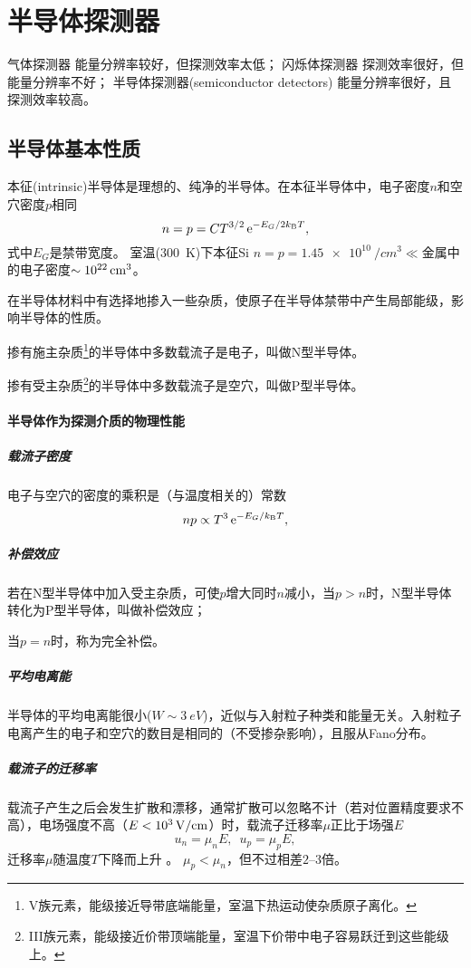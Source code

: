 \clearpage
\section{半导体探测器}
气体探测器
能量分辨率较好，但探测效率太低；
闪烁体探测器
探测效率很好，但能量分辨率不好；%
半导体探测器(semiconductor detectors)
能量分辨率很好，且探测效率较高。
\subsection{半导体基本性质}
本征(intrinsic)半导体是理想的、纯净的半导体。在本征半导体中，电子密度$n$和空穴密度$p$相同
\[
	n=p=CT^{3/2}\mathop{}\!\mathrm{e}^{-E_G/2k_{\mathrm B} T},
\]
式中$E_G$是禁带宽度。
室温(\SI{300}{K})下本征Si $n=p=\SI{1.45e10}{/cm^3}\ll$金属中的电子密度$\sim\SI{E22}{/cm^3}$。

在半导体材料中有选择地掺入一些杂质，使原子在半导体禁带中产生局部能级，影响半导体的性质。
\begin{compactitem}
	\item 掺有施主杂质\footnote{V族元素，能级接近导带底端能量，室温下热运动使杂质原子离化。}的半导体中多数载流子是电子，叫做N型半导体。
	\item 掺有受主杂质\footnote{III族元素，能级接近价带顶端能量，室温下价带中电子容易跃迁到这些能级上。}的半导体中多数载流子是空穴，叫做P型半导体。
\end{compactitem}
\paragraph{半导体作为探测介质的物理性能}
\subparagraph{载流子密度}
电子与空穴的密度的乘积是（与温度相关的）常数
\[
	np\propto T^3\mathop{}\!\mathrm{e}^{-E_G/k_{\mathrm B} T},
\]
\subparagraph{补偿效应}
若在N型半导体中加入受主杂质，可使$p$增大同时$n$减小，当$p>n$时，N型半导体转化为P型半导体，叫做补偿效应；

当$p=n$时，称为完全补偿。

\subparagraph{平均电离能}
半导体的平均电离能很小($W\sim\SI{3}{eV}$)，近似与入射粒子种类和能量无关。入射粒子电离产生的电子和空穴的数目是相同的（不受掺杂影响），且服从Fano分布。
\subparagraph{载流子的迁移率}
载流子产生之后会发生扩散和漂移，通常扩散可以忽略不计（若对位置精度要求不高），电场强度不高（$E<\SI{E3}{V/cm}$）时，载流子迁移率$\mu$正比于场强$E$
\[
	u_n=\mu_nE,\enspace u_p=\mu_pE,
\]
迁移率$\mu$随温度$T$下降而上升%
。%
$\mu_p<\mu_n$，但不过相差$\numrange{2}{3}$倍。

